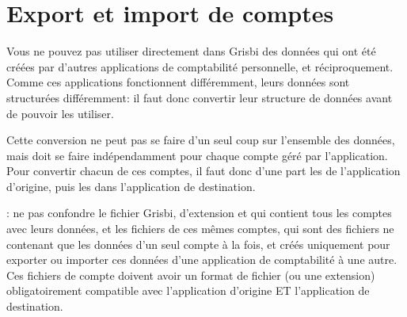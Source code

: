

\chapter{Export et import de comptes\label{move}}

Vous ne pouvez pas utiliser directement dans Grisbi des données qui ont été créées par d'autres applications de comptabilité personnelle, et réciproquement. Comme ces applications fonctionnent différemment, leurs données sont structurées différemment: il faut donc convertir leur structure de données avant de pouvoir les utiliser. 

Cette conversion ne peut pas se faire d'un seul coup sur l'ensemble des données, mais doit se faire indépendamment pour chaque compte géré par l'application. Pour convertir chacun de ces comptes, il faut donc d'une part les  de l'application d'origine, puis les  dans l'application de destination.


\Note{}: ne pas confondre le fichier Grisbi, d'\gls{extension}  et qui contient tous les comptes avec leurs données, et les fichiers de ces mêmes comptes, qui sont des fichiers ne contenant que les données d'un seul compte à la fois, et créés uniquement pour exporter ou importer ces données d'une application de comptabilité à une autre. Ces fichiers de compte doivent avoir un \gls{format de fichier} (ou une extension) obligatoirement compatible avec l'application d'origine ET l'application de destination.



